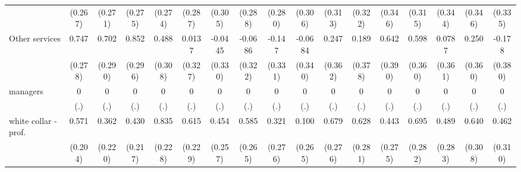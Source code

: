 {\begin{tabular}{l*{16}{c}}
                    &     (0.267)         &     (0.271)         &     (0.275)         &     (0.274)         &     (0.287)         &     (0.305)         &     (0.288)         &     (0.280)         &     (0.306)         &     (0.313)         &     (0.322)         &     (0.346)         &     (0.315)         &     (0.344)         &     (0.346)         &     (0.335)         \\
[1em]
Other services      &       0.747\sym{**} &       0.702\sym{*}  &       0.852\sym{**} &       0.488         &      0.0137         &     -0.0445         &     -0.0686         &      -0.147         &     -0.0684         &       0.247         &       0.189         &       0.642         &       0.598         &      0.0787         &       0.250         &      -0.178         \\
                    &     (0.278)         &     (0.290)         &     (0.296)         &     (0.308)         &     (0.327)         &     (0.330)         &     (0.322)         &     (0.331)         &     (0.340)         &     (0.362)         &     (0.378)         &     (0.390)         &     (0.360)         &     (0.361)         &     (0.360)         &     (0.380)         \\
[1em]
managers            &           0         &           0         &           0         &           0         &           0         &           0         &           0         &           0         &           0         &           0         &           0         &           0         &           0         &           0         &           0         &           0         \\
                    &         (.)         &         (.)         &         (.)         &         (.)         &         (.)         &         (.)         &         (.)         &         (.)         &         (.)         &         (.)         &         (.)         &         (.)         &         (.)         &         (.)         &         (.)         &         (.)         \\
[1em]
white collar - prof.&       0.571\sym{**} &       0.362         &       0.430\sym{*}  &       0.835\sym{***}&       0.615\sym{**} &       0.454         &       0.585\sym{*}  &       0.321         &       0.100         &       0.679\sym{*}  &       0.628\sym{*}  &       0.443         &       0.695\sym{*}  &       0.489         &       0.640\sym{*}  &       0.462         \\
                    &     (0.204)         &     (0.220)         &     (0.217)         &     (0.228)         &     (0.229)         &     (0.257)         &     (0.265)         &     (0.276)         &     (0.265)         &     (0.276)         &     (0.281)         &     (0.275)         &     (0.282)         &     (0.283)         &     (0.308)         &     (0.310)         \\

\end{tabular}}
